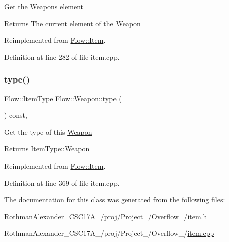Get the \hyperlink{class_flow_1_1_weapon}{Weapon}\textquotesingle{}s element \begin{DoxyReturn}{Returns}
The current element of the \hyperlink{class_flow_1_1_weapon}{Weapon} 
\end{DoxyReturn}


Reimplemented from \hyperlink{class_flow_1_1_item_ae108f4ebbdcd75ac4d4ee1d009330040}{Flow\+::\+Item}.



Definition at line 282 of file item.\+cpp.

\hypertarget{class_flow_1_1_weapon_afa86ebc4b8803a970425c947f96e7c94}{}\label{class_flow_1_1_weapon_afa86ebc4b8803a970425c947f96e7c94} 
\subsubsection{\texorpdfstring{type()}{type()}}
{\footnotesize\ttfamily \hyperlink{namespace_flow_a09368c0b65b3d1bc5c227ed1046c8bca}{Flow\+::\+Item\+Type} Flow\+::\+Weapon\+::type (\begin{DoxyParamCaption}{ }\end{DoxyParamCaption}) const\hspace{0.3cm}{\ttfamily [override]}, {\ttfamily [virtual]}}

Get the type of this \hyperlink{class_flow_1_1_weapon}{Weapon} \begin{DoxyReturn}{Returns}
\hyperlink{namespace_flow_a09368c0b65b3d1bc5c227ed1046c8bcaa18c83669920215a818638ad0e5421e4b}{Item\+Type\+::\+Weapon} 
\end{DoxyReturn}


Reimplemented from \hyperlink{class_flow_1_1_item_ae0c7ea7506ef62f2204837131f021f55}{Flow\+::\+Item}.



Definition at line 369 of file item.\+cpp.



The documentation for this class was generated from the following files\+:\begin{DoxyCompactItemize}
\item 
Rothman\+Alexander\+\_\+\+C\+S\+C17\+A\+\_/proj/\+Project\+\_/\+Overflow\+\_/\hyperlink{item_8h}{item.\+h}\item 
Rothman\+Alexander\+\_\+\+C\+S\+C17\+A\+\_/proj/\+Project\+\_/\+Overflow\+\_/\hyperlink{item_8cpp}{item.\+cpp}\end{DoxyCompactItemize}

